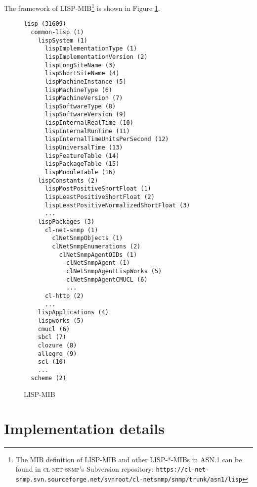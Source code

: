 \documentclass[reprint,9pt]{sigplanconf}
\begin{document}
The framework of LISP-MIB\footnote{The MIB definition of
  LISP-MIB and other LISP-*-MIBs in ASN.1 can be found in \textsc{cl-net-snmp}'s
  Subversion repository:
  \texttt{https://cl-net-snmp.svn.sourceforge.net/svnroot/cl-net\-snmp/snmp/trunk/asn1/lisp}}
is shown in Figure \ref{fig:lisp-mib}.

\begin{figure}
\begin{verbatim}
lisp (31609)
  common-lisp (1)
    lispSystem (1)
      lispImplementationType (1)
      lispImplementationVersion (2)
      lispLongSiteName (3)
      lispShortSiteName (4)
      lispMachineInstance (5)
      lispMachineType (6)
      lispMachineVersion (7)
      lispSoftwareType (8)
      lispSoftwareVersion (9)
      lispInternalRealTime (10)
      lispInternalRunTime (11)
      lispInternalTimeUnitsPerSecond (12)
      lispUniversalTime (13)
      lispFeatureTable (14)
      lispPackageTable (15)
      lispModuleTable (16)
    lispConstants (2)
      lispMostPositiveShortFloat (1)
      lispLeastPositiveShortFloat (2)
      lispLeastPositiveNormalizedShortFloat (3)
      ...
    lispPackages (3)
      cl-net-snmp (1)
        clNetSnmpObjects (1)
        clNetSnmpEnumerations (2)
          clNetSnmpAgentOIDs (1)
            clNetSnmpAgent (1)
            clNetSnmpAgentLispWorks (5)
            clNetSnmpAgentCMUCL (6)
            ...
      cl-http (2)
      ...
    lispApplications (4)
    lispworks (5)
    cmucl (6)
    sbcl (7)
    clozure (8)
    allegro (9)
    scl (10)
    ...
  scheme (2)
\end{verbatim}  
  \caption{LISP-MIB}
  \label{fig:lisp-mib}
\end{figure}

\section{Implementation details}


\end{document}
